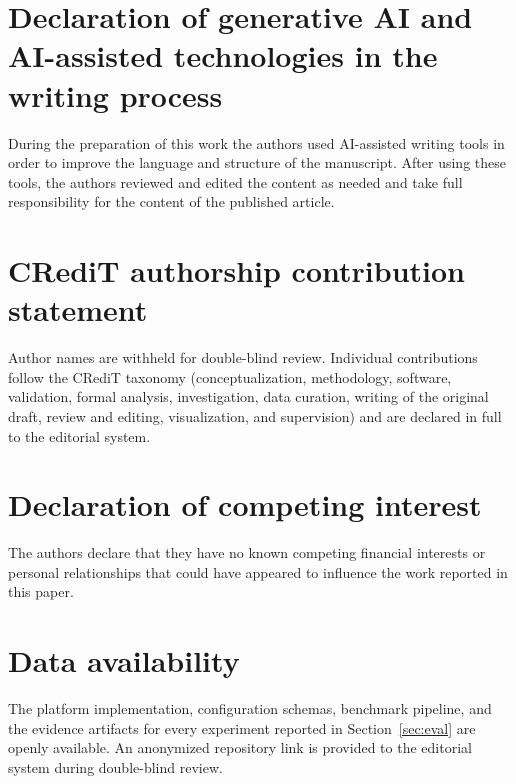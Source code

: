 \documentclass[authoryear,preprint,12pt,a4paper]{elsarticle}
\begin{document}









\section*{Declaration of generative AI and AI-assisted technologies in the
writing process}
During the preparation of this work the authors used AI-assisted writing
tools in order to improve the language and structure of the manuscript.
After using these tools, the authors reviewed and edited the content as
needed and take full responsibility for the content of the published
article.

\section*{CRediT authorship contribution statement}
Author names are withheld for double-blind review. Individual contributions
follow the CRediT taxonomy (conceptualization, methodology, software,
validation, formal analysis, investigation, data curation, writing of the
original draft, review and editing, visualization, and supervision) and are
declared in full to the editorial system.

\section*{Declaration of competing interest}
The authors declare that they have no known competing financial interests or
personal relationships that could have appeared to influence the work
reported in this paper.

\section*{Data availability}
The platform implementation, configuration schemas, benchmark pipeline, and
the evidence artifacts for every experiment reported in Section~\ref{sec:eval}
are openly available. An anonymized repository link is provided to the
editorial system during double-blind review.



\end{document}

